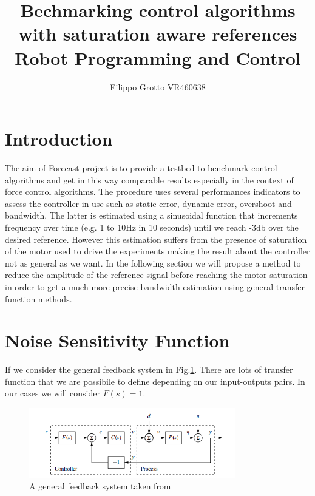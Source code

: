 \documentclass[a4paper,12pt]{article}
\begin{document}
\author{Filippo Grotto VR460638}

\title{Bechmarking control algorithms with saturation aware references \\[1ex] \large Robot Programming and Control}

\maketitle
\tableofcontents

\section{Introduction}
The aim of Forecast project \cite{Forecast} is to provide a testbed to benchmark control algorithms and get in this way comparable results especially in the context of force control algorithms. The procedure uses several performances indicators to assess the controller in use such as static error, dynamic error, overshoot and bandwidth. The latter is estimated using a sinusoidal function that increments frequency over time (e.g. 1 to 10Hz in 10 seconds) until we reach -3db over the desired reference. However this estimation suffers from the presence of saturation of the motor used to drive the experiments making the result about the controller not as general as we want. In the following section we will propose a method to reduce the amplitude of the reference signal before reaching the motor saturation in order to get a much more precise bandwidth estimation using general transfer function methods.

\newpage
\section{Noise Sensitivity Function}
If we consider the general feedback system in Fig.\ref{fig:feedback}. There are lots of transfer function that we are possibile to define depending on our input-outputs pairs. In our cases we will consider $F(s)=1$. 

\begin{figure}[H]
\begin{center}
\includegraphics[width=0.8\textwidth]{images/feedback.png}
\end{center}
\caption{A general feedback system taken from \cite{scientist}}
\label{fig:feedback}
\end{figure}
\end{document}
